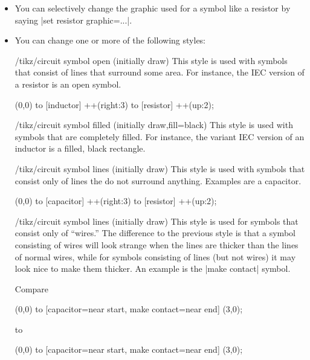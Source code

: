 \begin{itemize}
\begin{codeexample}[]
\end{codeexample}
\item You can selectively change the graphic used for a symbol like a
  resistor by saying |set resistor graphic=...|.
\item You can change one or more of the following styles:
  \begin{stylekey}{/tikz/circuit symbol open (initially draw)}
    This style is used with symbols that consist of lines that
    surround some area. For instance, the IEC version of a resistor is
    an open symbol. 
\begin{codeexample}[]
\tikz [circuit ee IEC,
       circuit symbol open/.style={thick,draw,fill=yellow}]
  \draw (0,0) to [inductor] ++(right:3) to [resistor] ++(up:2);
\end{codeexample}
  \end{stylekey}
  \begin{stylekey}{/tikz/circuit symbol filled (initially {draw,fill=black})}
    This style is used with symbols that are completely filled. For
    instance, the variant IEC version of an inductor is a filled,
    black rectangle. 
  \end{stylekey}
  \begin{stylekey}{/tikz/circuit symbol lines (initially draw)}
    This style is used with symbols that consist only of lines the do
    not surround anything. Examples are a capacitor.
\begin{codeexample}[]
\tikz [circuit ee IEC,
       circuit symbol lines/.style={thick,draw=red}]
  \draw (0,0) to [capacitor] ++(right:3) to [resistor] ++(up:2);
\end{codeexample}
  \end{stylekey}
  \begin{stylekey}{/tikz/circuit symbol lines (initially draw)}
    This style is used for symbols that consist only of ``wires.'' The
    difference to the previous style is that a symbol consisting of
    wires will look strange when the lines are thicker than the lines
    of normal wires, while for symbols consisting of lines (but not
    wires) it may look nice to make them thicker. An example is the
    |make contact| symbol.

    Compare 
\begin{codeexample}[]
\tikz [circuit ee IEC,circuit symbol lines/.style={draw,very thick}]
  \draw (0,0) to [capacitor={near start},
                  make contact={near end}] (3,0);
\end{codeexample}
    to 
\begin{codeexample}[]
\tikz [circuit ee IEC,circuit symbol wires/.style={draw,very thick}]
  \draw (0,0) to [capacitor={near start},
                  make contact={near end}] (3,0);
\end{codeexample}
  \end{stylekey}
\end{itemize}

